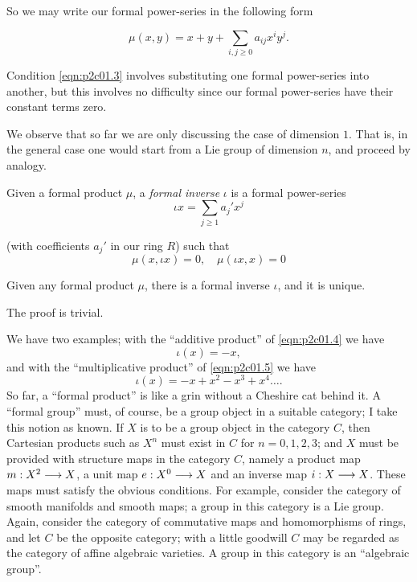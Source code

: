 \documentclass[../main]{subfiles}
\begin{document}
So we may write our formal power-series in the following form 

\begin{equation}
\tag{1.7}
\label{eqn:p2c01.7}
\mu(x, y) = x + y + \sum_{i, j \ge 0} a_{ij} x^i y^j.
\end{equation}

Condition \eqref{eqn:p2c01.3} involves substituting one formal power-series into another, but this involves no difficulty since our formal power-series have their constant terms zero.

We observe that so far we are only discussing the case of dimension $1$. That is, in the general case one would start from a Lie group of dimension $n$, and proceed by analogy.

Given a formal product $\mu$, a \emph{formal inverse} $\iota$ is a formal power-series
\begin{equation}
\tag{1.8}
\label{eqn:p2c01.8}
\iota x = \sum_{j \ge 1} a_j' x^j
\end{equation}

(with coefficients $a_j'$ in our ring $R$) such that 
\begin{equation}
\tag{1.9}
\label{eqn:p2c01.9}
\mu(x, \iota x) = 0, \quad \mu(\iota x, x) = 0
\end{equation}

\begin{lemma}
\label{lem:p2c01.10}
Given any formal product $\mu$, there is a formal inverse $\iota$, and it is unique.
\end{lemma}

The proof is trivial. 

We have two examples; with the ``additive product'' of \eqref{eqn:p2c01.4} we have $$\iota(x) = -x,$$ and with the ``multiplicative product'' of \eqref{eqn:p2c01.5} we have $$\iota(x) = -x + x^2 - x^3 + x^4 \ldots.$$ So far, a ``formal product'' is like a grin without a Cheshire cat behind it. A ``formal group'' must, of course, be a group object in a suitable category; I take this notion as known. If $X$ is to be a group object in the category $C$, then Cartesian products such as $X^n$ must exist in $C$ for $n = 0, 1, 2, 3$; and $X$ must be provided with structure maps in the category $C$, namely a product map $m : X^2 \overset{}{\longrightarrow} X$, a unit map $e : X^0 \overset{}{\longrightarrow} X$ and an inverse map $i : X \overset{}{\longrightarrow} X$. These maps must satisfy the obvious conditions. For example, consider the category of smooth manifolds and smooth maps; a group in this category is a Lie group. Again, consider the category of commutative maps and homomorphisms of rings, and let $C$ be the opposite category; with a little goodwill $C$ may be regarded as the category of affine algebraic varieties. A group in this category is an ``algebraic group''.\\
\end{document}
